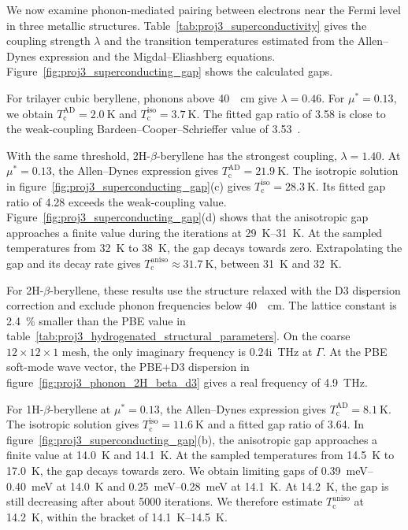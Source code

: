 We now examine phonon-mediated pairing between electrons near the Fermi level in three metallic structures.
Table~\ref{tab:proj3_superconductivity} gives the coupling strength $\lambda$ and the transition temperatures estimated from the Allen--Dynes expression and the Migdal--Eliashberg equations.
Figure~\ref{fig:proj3_superconducting_gap} shows the calculated gaps.

For trilayer cubic beryllene, phonons above \qty{40}{\per\centi\metre} give $\lambda=0.46$.
For $\mu^*=0.13$, we obtain $T_\mathrm{c}^{\mathrm{AD}}=\qty{2.0}{\kelvin}$ and $T_\mathrm{c}^{\mathrm{iso}}=\qty{3.7}{\kelvin}$.
The fitted gap ratio of 3.58 is close to the weak-coupling Bardeen--Cooper--Schrieffer value of 3.53~\cite{bardeen1957theory}.

With the same threshold, 2H-$\beta$-beryllene has the strongest coupling, $\lambda=1.40$.
At $\mu^*=0.13$, the Allen--Dynes expression gives $T_\mathrm{c}^{\mathrm{AD}}=\qty{21.9}{\kelvin}$.
The isotropic solution in figure~\ref{fig:proj3_superconducting_gap}(c) gives $T_\mathrm{c}^{\mathrm{iso}}=\qty{28.3}{\kelvin}$.
Its fitted gap ratio of 4.28 exceeds the weak-coupling value.
Figure~\ref{fig:proj3_superconducting_gap}(d) shows that the anisotropic gap approaches a finite value during the iterations at \qtyrange{29}{31}{\kelvin}.
At the sampled temperatures from \qty{32}{\kelvin} to \qty{38}{\kelvin}, the gap decays towards zero.
Extrapolating the gap and its decay rate gives $T_\mathrm{c}^{\mathrm{aniso}}\approx\qty{31.7}{\kelvin}$, between \qty{31}{\kelvin} and \qty{32}{\kelvin}.

For 2H-$\beta$-beryllene, these results use the structure relaxed with the D3 dispersion correction and exclude phonon frequencies below \qty{40}{\per\centi\metre}.
The lattice constant is \qty{2.4}{\percent} smaller than the PBE value in table~\ref{tab:proj3_hydrogenated_structural_parameters}.
On the coarse $12 \times 12 \times 1$ mesh, the only imaginary frequency is $0.24\mathrm{i}$~\unit{\tera\hertz} at $\Gamma$.
At the PBE soft-mode wave vector, the PBE+D3 dispersion in figure~\ref{fig:proj3_phonon_2H_beta_d3} gives a real frequency of \qty{4.9}{\tera\hertz}.

For 1H-$\beta$-beryllene at $\mu^*=0.13$, the Allen--Dynes expression gives $T_\mathrm{c}^{\mathrm{AD}}=\qty{8.1}{\kelvin}$.
The isotropic solution gives $T_\mathrm{c}^{\mathrm{iso}}=\qty{11.6}{\kelvin}$ and a fitted gap ratio of 3.64.
In figure~\ref{fig:proj3_superconducting_gap}(b), the anisotropic gap approaches a finite value at \qty{14.0}{\kelvin} and \qty{14.1}{\kelvin}.
At the sampled temperatures from \qty{14.5}{\kelvin} to \qty{17.0}{\kelvin}, the gap decays towards zero.
We obtain limiting gaps of \qtyrange{0.39}{0.40}{\milli\electronvolt} at \qty{14.0}{\kelvin} and \qtyrange{0.25}{0.28}{\milli\electronvolt} at \qty{14.1}{\kelvin}.
At \qty{14.2}{\kelvin}, the gap is still decreasing after about 5000 iterations.
We therefore estimate $T_\mathrm{c}^{\mathrm{aniso}}$ at \qty{14.2}{\kelvin}, within the bracket of \qtyrange{14.1}{14.5}{\kelvin}.


